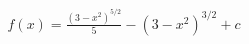 \documentclass[preview]{standalone}
\begin{document}
\begin{align*}
f(x) = \frac{(3-x^2)^{5/2}}{5} - (3-x^2)^{3/2} + c
\end{align*}
\end{document}
